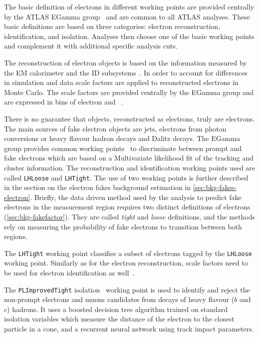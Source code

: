 The basic definition of electrons in different working points are provided
centrally by the ATLAS EGamma group~\cite{web:EGammaRecommendations} and are common to all
ATLAS analyses. These basic definitions are based on three categories:
electron reconstruction, identification, and isolation. Analyses then
choose one of the basic working points and complement it with additional
specific analysis cuts.

The reconstruction of electron objects is based on the information measured by
the EM calorimeter and the ID subsystems~\cite{ATLAS-CONF-2014-032, PERF-2013-03}.
In order to account for differences in simulation and data scale factors
are applied to reconstructed electrons in Monte Carlo. The scale factors
are provided centrally by the EGamma group and are expressed in bins of
electron \pt and \eta~\cite{web:EGammaRecommendations}. 

There is no guarantee that objects, reconstructed as electrons, truly
are electrons. The main sources of fake electron objects are jets, electrons
from photon conversions or heavy flavour hadron decays and Dalitz decays.
The EGamma group provides common working points~\cite{web:EGammaRecommendations}
to discriminate between prompt and fake electrons which are based on
a Multivariate likelihood fit of the tracking and cluster information.
The reconstruction and identification working points used are called
\texttt{LHLoose} and \texttt{LHTight}. The use of two working points
is further described in the section on the electron fakes background estimation
in \cref{sec:bkg-fakes-electron}. Briefly, the data driven method used
by the analysis to predict fake electrons in the measurement region requires two
distinct definitions of electrons (\cref{sec:bkg-fakefactor}).
They are called \textit{tight} and \textit{loose} definitions, and the methods
rely on measuring the probability of fake electrons to transition between
both regions.

The \texttt{LHTight} working point classifies a subset of electrons tagged
by the \texttt{LHLoose} working point. Similarly as for the electron
reconstruction, scale factors need to be used for
electron identification as well~\cite{web:EGammaRecommendations}.

The \texttt{PLImprovedTight} isolation~\cite{web:PLImprovedWPs} working point
is used to identify and reject the non-prompt electrons and muons candidates
from decays of heavy flavour (\(b\) and \(c\)) hadrons. It uses
a boosted decision tree algorithm trained on standard isolation variables
which measure the distance of the electron to the closest particle in a cone,
and a recurrent neural network using track impact parameters.

